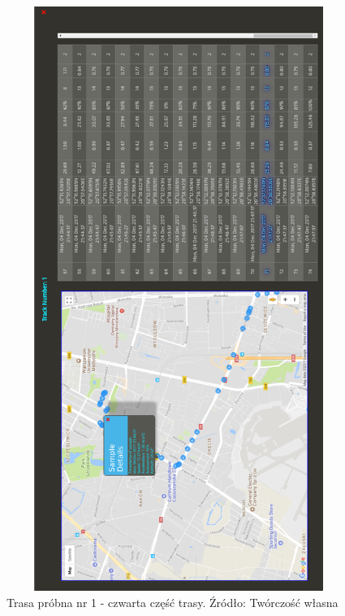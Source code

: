 \begin{figure}[H]
	\centering
	\includegraphics[height=19cm, width=13cm]{img/driving_analysis/test_track_part_4.png}
	\caption{Trasa próbna nr 1 - czwarta część trasy. Źródło: Twórczość własna}
	\label{fig:image_driving_analysis_alghoritm_track_1_part_4}
\end{figure}
